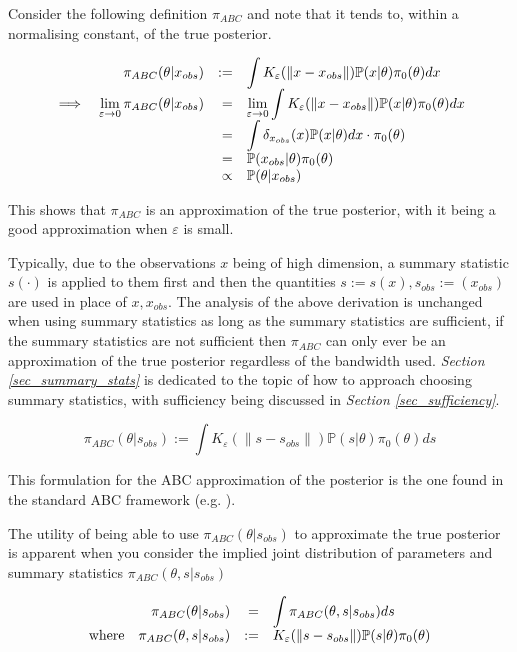 \documentclass[11pt,a4paper]{article}
\newcommand*{\prob}{\mathbb{P}}
\theoremstyle{break}
\begin{document}
  \par Consider the following definition $\pi_{ABC}$ and note that it tends to, within a normalising constant, of the true posterior.

  \[
  \everymath={\displaystyle}
  \begin{array}{rrrl}
    &\pi_{ABC}(\theta|x_{obs})&:=&\int K_\varepsilon(\|x-x_{obs}\|)\prob(x|\theta)\pi_0(\theta)dx\\
    \implies&\lim_{\varepsilon\to0}\pi_{ABC}(\theta|x_{obs})&=&\lim_{\varepsilon\to0}\int K_\varepsilon(\|x-x_{obs}\|)\prob(x|\theta)\pi_0(\theta)dx\\
    &&=&\int \delta_{x_{obs}}(x)\prob(x|\theta)dx\cdot \pi_0(\theta)\\
    &&=&\prob(x_{obs}|\theta)\pi_0(\theta)\\
    &&\propto&\prob(\theta|x_{obs})
  \end{array}\]

  \noindent This shows that $\pi_{ABC}$ is an approximation of the true posterior, with it being a good approximation when $\varepsilon$ is small.
  \par Typically, due to the observations $x$ being of high dimension, a summary statistic $s(\cdot)$ is applied to them first and then the quantities $s:=s(x),s_{obs}:=(x_{obs})$ are used in place of $x,x_{obs}$. The analysis of the above derivation is unchanged when using summary statistics as long as the summary statistics are sufficient, if the summary statistics are not sufficient then $\pi_{ABC}$ can only ever be an approximation of the true posterior regardless of the bandwidth used. \textit{Section \ref{sec_summary_stats}} is dedicated to the topic of how to approach choosing summary statistics, with sufficiency being discussed in \textit{Section \ref{sec_sufficiency}}.

  \[ \pi_{ABC}(\theta|s_{obs}):=\int K_\varepsilon(\|s-s_{obs}\|)\prob(s|\theta)\pi_0(\theta)ds \]

  This formulation for the ABC approximation of the posterior is the one found in the standard ABC framework (e.g. \cite[]{overview_of_abc,annual_review_of_statistics_ABC}).

  \par The utility of being able to use $\pi_{ABC}(\theta|s_{obs})$ to approximate the true posterior is apparent when you consider the implied joint distribution of parameters and summary statistics $\pi_{ABC}(\theta,s|s_{obs})$

  \[\everymath={\displaystyle}\begin{array}{rrrl}
    &\pi_{ABC}(\theta|s_{obs})&=&\int \pi_{ABC}(\theta,s|s_{obs})ds\\
    \text{where}&\pi_{ABC}(\theta,s|s_{obs})&:=&K_\varepsilon(\|s-s_{obs}\|)\prob(s|\theta)\pi_0(\theta)
  \end{array}\]
\end{document}
